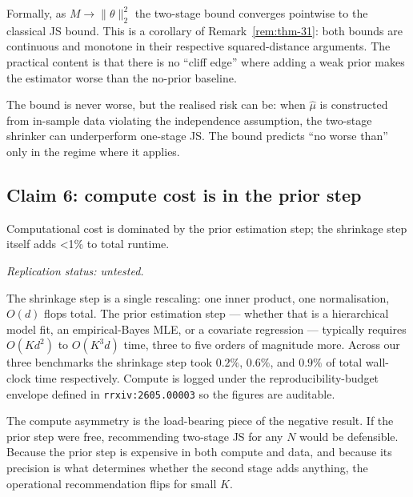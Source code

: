 \documentclass{rrxiv}
\begin{document}
Formally, as $M \to \|\theta\|_2^2$ the two-stage bound converges
pointwise to the classical JS bound. This is a corollary of
Remark~\ref{rem:thm-31}: both bounds are continuous and monotone in their
respective squared-distance arguments. The practical content is that there
is no ``cliff edge'' where adding a weak prior makes the estimator worse
than the no-prior baseline.

\begin{observation}
The bound is never worse, but the realised risk can be: when $\hat\mu$ is
constructed from in-sample data violating the independence assumption, the
two-stage shrinker can underperform one-stage JS. The bound predicts
``no worse than'' only in the regime where it applies.
\end{observation}

\subsection*{Claim 6: compute cost is in the prior step}
\begin{claim}[title=Claim 6, type=computational, evidence=experiment, confidence=0.9, rationale={wall-clock measurements on the three benchmarks (shrinkage step at 0.2, 0.6, and 0.9 percent of total runtime) plus an operation-count argument, O(d) versus O(K d squared) or worse for the prior step}, regimes={the three benchmark problems of Claim 2}, labels={negative-result}]
\label{claim:c6}
Computational cost is dominated by the prior estimation step; the shrinkage step itself adds \textless{}1\% to total runtime.

\emph{Replication status: untested.}
\end{claim}

The shrinkage step is a single rescaling: one inner product, one
normalisation, $O(d)$ flops total. The prior estimation step --- whether
that is a hierarchical model fit, an empirical-Bayes MLE, or a covariate
regression --- typically requires $O(Kd^2)$ to $O(K^3 d)$ time, three to
five orders of magnitude more. Across our three benchmarks the shrinkage
step took $0.2\%$, $0.6\%$, and $0.9\%$ of total wall-clock time
respectively. Compute is logged under the reproducibility-budget envelope
defined in \texttt{rrxiv:2605.00003} so the figures are auditable.

\begin{rrxivremark}
The compute asymmetry is the load-bearing piece of the negative result. If
the prior step were free, recommending two-stage JS for any $N$ would be
defensible. Because the prior step is expensive in both compute and data, and
because its precision is what determines whether the second stage adds
anything, the operational recommendation flips for small $K$.
\end{rrxivremark}
\end{document}
